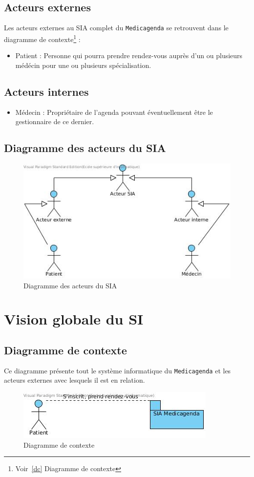 \subsection{Acteurs externes}
Les acteurs externes au SIA complet du \texttt{Medicagenda} se retrouvent dans le 
diagramme de contexte\footnote{Voir~\ref{dc} Diagramme de contexte} : 
\begin{itemize}
	\item Patient : Personne qui pourra prendre rendez-vous auprès d'un ou
		plusieurs médécin pour une ou plusieurs spécialisation.
\end{itemize}
\subsection{Acteurs internes}
\begin{itemize}
	\item Médecin : Propriétaire de l'agenda pouvant éventuellement être le
		gestionnaire de ce dernier.
\end{itemize}
\subsection{Diagramme des acteurs du SIA}
\begin{figure}[hb]
	\centering
	\includegraphics[scale=0.7]{MCT/acteurs.jpg}
	\caption{Diagramme des acteurs du SIA}
	\label{fig:acteurs}
\end{figure}
\newpage
\section{Vision globale du SI}
\subsection{\label{dc}Diagramme de contexte}
Ce diagramme présente tout le système informatique du \texttt{Medicagenda} et les acteurs 
externes avec lesquels il est en relation. 
\begin{figure}[hb]
	\centering
	\includegraphics[scale=0.7]{MCT/contexte.jpg}
	\caption{Diagramme de contexte}
	\label{fig:contexte}
\end{figure}
